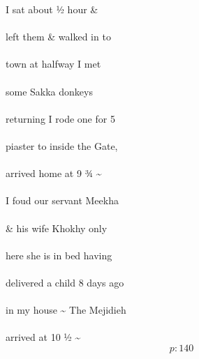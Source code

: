 \documentclass{report}
\begin{document}
	\par{
 	I sat about ½ hour \&\ \\\ \\left them \& walked in to\ \\\ \\town at halfway I met\ \\\ \\some Sakka donkeys\ \\\ \\returning I rode one for 5\ \\\ \\piaster to inside the Gate,\ \\\ \\arrived home at 9 ¾ \~{}\ \\\ \\I foud our servant Meekha\ \\\ \\\& his wife Khokhy only\ \\\ \\here she is in bed having\ \\\ \\delivered a child 8 days ago\ \\\ \\in my house \~{} The Mejidieh\ \\\ \\arrived at 10 ½ \~{}\ \\
  \[p: 140 \]

	}

\end{document}
